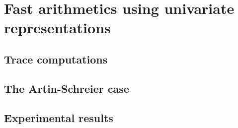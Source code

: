 \newcommand{\AS}[1]{\mathcal{#1}}  %
\newcommand{\biv}[1]{\mathfrak{#1}}  %
\newcommand{\vect}[1]{\vec{#1}}  %
\newcommand{\bs}{\mathbf{s}}  %
\newcommand{\bC}{\mathbf{C}}  %
\newcommand{\bB}{\mathbf{B}}  %
\newcommand{\bD}{\mathbf{D}}  %
\newcommand{\bP}{\mathbf{P}}  %

\newcommand{\sC}{\mathsf{K}}  %
\renewcommand{\L}{\mathsf{L}}  %

\part{Fast arithmetics using univariate representations}


\chapter{Trace computations}




\chapter{The Artin-Schreier case}







%

\chapter{Experimental results}



